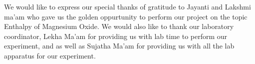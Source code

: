 We would like to express our special thanks of gratitude to Jayanti and Lakshmi ma'am who gave us the golden oppurtunity to perform our project on the topic Enthalpy of Magnesium Oxide. We would also like to thank our laboratory coordinator, Lekha Ma'am for providing us with lab time to perform our experiment, and as well as Sujatha Ma'am for providing us with all the lab apparatus for our experiment.

